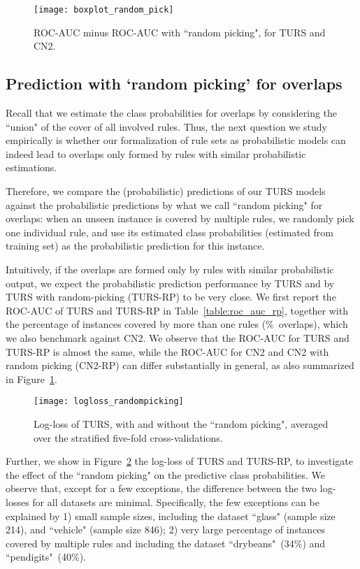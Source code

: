 
\begin{figure}[ht] \centering
\texttt{[image: boxplot\_random\_pick]}	
\caption{ROC-AUC minus ROC-AUC with ``random picking", for TURS and CN2. } \label{fig:diff_rp}
\end{figure}

\subsection{Prediction with `random picking' for overlaps}
Recall that we estimate the class probabilities for overlaps by considering the ``union" of the cover of all involved rules. Thus, the next question we study empirically is whether our formalization of rule sets as probabilistic models can indeed lead to overlaps only formed by rules with similar probabilistic estimations. 

Therefore, we compare the (probabilistic) predictions of our TURS models against the probabilistic predictions by what we call ``random picking" for overlaps: when an unseen instance is covered by multiple rules, we randomly pick one individual rule, and use its estimated class probabilities (estimated from training set) as the probabilistic prediction for this instance. 

Intuitively, if the overlaps are formed only by rules with similar probabilistic output, we expect the probabilistic prediction performance by TURS and by TURS with random-picking (TURS-RP) to be very close. We first report the ROC-AUC of TURS and TURS-RP in Table~\ref{table:roc_auc_rp}, together with the percentage of instances covered by more than one rules (\%~overlaps), which we also benchmark against CN2. We observe that the ROC-AUC for TURS and TURS-RP is almost the same, while the ROC-AUC for CN2 and CN2 with random picking (CN2-RP) can differ substantially in general, as also summarized in Figure~\ref{fig:diff_rp}.
\begin{figure}[ht] \centering 
	\texttt{[image: logloss\_randompicking]}
	\caption{Log-loss of TURS, with and without the ``random picking", averaged over the stratified five-fold cross-validations. } \label{fig:logloss_rp}
\end{figure}

Further, we show in Figure~\ref{fig:logloss_rp} the log-loss of TURS and TURS-RP, to investigate the effect of the ``random picking" on the predictive class probabilities. We observe that, except for a few exceptions, the difference between the two log-losses for all datasets are minimal. Specifically, the few exceptions can be explained by 1) small sample sizes, including the dataset ``glass" (sample size 214), and ``vehicle" (sample size 846); 2) very large percentage of instances covered by multiple rules and including the dataset ``drybeans"~(34\%) and ``pendigits"~(40\%). 

